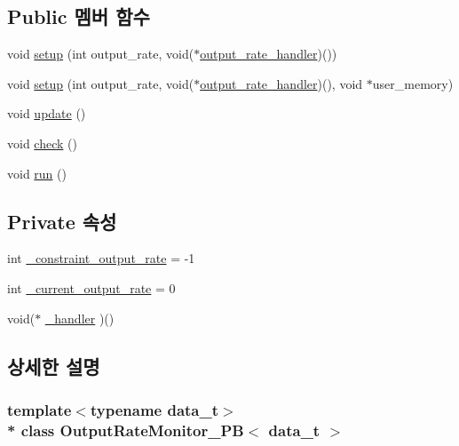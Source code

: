 \subsection*{Public 멤버 함수}
\begin{DoxyCompactItemize}
\item 
void \hyperlink{classOutputRateMonitor__PB_a6451be96235fc9eea26d621337c63ecd}{setup} (int output\+\_\+rate, void($\ast$\hyperlink{sample__main_8cpp_a0167d75fe4305d84db6ab81870dbcefb}{output\+\_\+rate\+\_\+handler})())
\item 
void \hyperlink{classOutputRateMonitor__PB_a41047776df8445bd7f11e2ff84c18a55}{setup} (int output\+\_\+rate, void($\ast$\hyperlink{sample__main_8cpp_a0167d75fe4305d84db6ab81870dbcefb}{output\+\_\+rate\+\_\+handler})(), void $\ast$user\+\_\+memory)
\item 
void \hyperlink{classOutputRateMonitor__PB_aa7cb6d5f781c0c8f184f77ff75165551}{update} ()
\item 
void \hyperlink{classOutputRateMonitor__PB_a83fb4d8302c5fc81b6df3572bf36e3fa}{check} ()
\item 
void \hyperlink{classOutputRateMonitor__PB_a70b33af1d380ef469b783f315bb58269}{run} ()
\end{DoxyCompactItemize}
\subsection*{Private 속성}
\begin{DoxyCompactItemize}
\item 
int \hyperlink{classOutputRateMonitor__PB_a5743656477250ee9c8ad90bbfa3f6bbd}{\+\_\+constraint\+\_\+output\+\_\+rate} = -\/1
\item 
int \hyperlink{classOutputRateMonitor__PB_a283856993acbc90229b59b6fad95c6b8}{\+\_\+current\+\_\+output\+\_\+rate} = 0
\item 
void($\ast$ \hyperlink{classOutputRateMonitor__PB_ac685f0ea378935bea1e01d86fecfc6e4}{\+\_\+handler} )()
\end{DoxyCompactItemize}


\subsection{상세한 설명}
\subsubsection*{template$<$typename data\+\_\+t$>$\\*
class Output\+Rate\+Monitor\+\_\+\+P\+B$<$ data\+\_\+t $>$}

